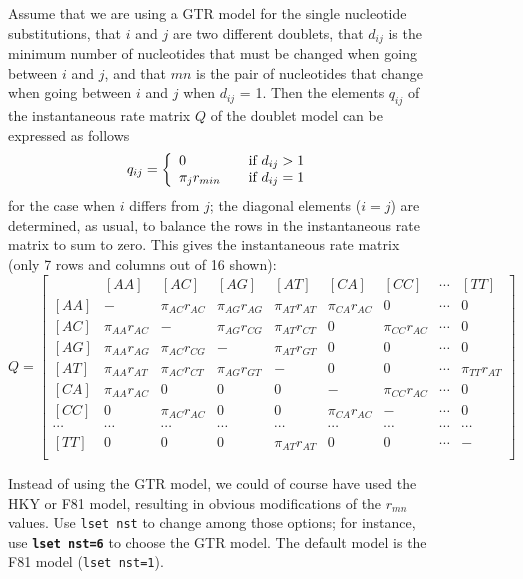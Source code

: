 \documentclass[12pt]{book}
\newcommand{\ttt}[1]{\texttt{#1}}
\newcommand{\tb}[1]{\ttt{\textbf{#1}}}
\begin{document}
\begin{figure}[h]
Assume that we are using a GTR model for the single nucleotide substitutions, that $i$ and $j$ are
two different doublets, that $d_{ij}$ is the minimum number of nucleotides that must be changed
when going between $i$ and $j$, and that $mn$ is the pair of nucleotides that change when going
between $i$ and $j$ when $d_{ij}$ = 1. Then the elements $q_{ij}$ of the instantaneous rate matrix
$Q$ of the doublet model can be expressed as follows
\[
q_{ij} = \left\{
\begin{array}{l l}
  0 & \quad \text{if} ~d_{ij}>1 \\
 \pi_j r_{min} & \quad \text{if} ~d_{ij}=1\\
\end{array} \right.
\]
for the case when $i$ differs from $j$; the diagonal elements ($i = j$) are determined, as usual,
to balance the rows in the instantaneous rate matrix to sum to zero. This gives the instantaneous
rate matrix (only 7 rows and columns out of 16 shown):
\footnotesize
\[
Q=\begin{bmatrix}
    & [AA] & [AC] & [AG] & [AT] & [CA] & [CC] & \cdots & [TT]\\
 [AA]& - & \pi_{AC} r_{AC} & \pi_{AG} r_{AG} & \pi_{AT} r_{AT}& \pi_{CA} r_{AC} & 0 & \cdots & 0\\
 [AC]& \pi_{AA} r_{AC} & - & \pi_{AG} r_{CG} & \pi_{AT} r_{CT}& 0 & \pi_{CC} r_{AC} & \cdots & 0\\
 [AG]& \pi_{AA} r_{AG} & \pi_{AC} r_{CG} & - & \pi_{AT} r_{GT}& 0 & 0 & \cdots & 0 \\
 [AT]& \pi_{AA} r_{AT} & \pi_{AC} r_{CT} & \pi_{AG} r_{GT}& -& 0 & 0 & \cdots &  \pi_{TT} r_{AT}\\
 [CA]& \pi_{AA} r_{AC} & 0 & 0 & 0 & - &  \pi_{CC} r_{AC} & \cdots & 0\\
 [CC]& 0 & \pi_{AC} r_{AC} & 0 & 0 & \pi_{CA} r_{AC} & -  & \cdots & 0\\
 \cdots& \cdots& \cdots& \cdots& \cdots& \cdots& \cdots& \cdots& \cdots\\
 [TT]& 0 & 0 & 0 &\pi_{AT} r_{AT} & 0 & 0 & \cdots & -\\
\end{bmatrix}
\]
\normalsize

Instead of using the GTR model, we could of course have used the HKY or F81 model, resulting in
obvious modifications of the $r_{mn}$ values. Use \ttt{lset nst} to change among those options; for
instance, use \tb{lset nst=6} to choose the GTR model. The default model is the F81 model
(\ttt{lset nst=1}).


\end{figure}
\end{document}
